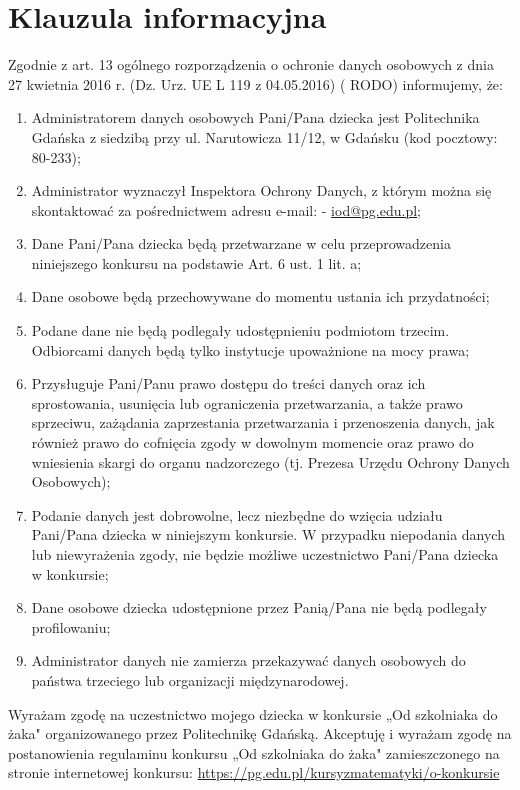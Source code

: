\documentclass[10pt]{article}
\begin{document}
\section*{Klauzula informacyjna}
Zgodnie z art. 13 ogólnego rozporządzenia o ochronie danych osobowych z dnia 27 kwietnia 2016 r. (Dz. Urz. UE L 119 z 04.05.2016) ( RODO) informujemy, że:

\begin{enumerate}
  \item Administratorem danych osobowych Pani/Pana dziecka jest Politechnika Gdańska z siedzibą przy ul. Narutowicza 11/12, w Gdańsku (kod pocztowy: 80-233);
  \item Administrator wyznaczył Inspektora Ochrony Danych, z którym można się skontaktować za pośrednictwem adresu e-mail: - \href{mailto:iod@pg.edu.pl}{iod@pg.edu.pl};
  \item Dane Pani/Pana dziecka będą przetwarzane w celu przeprowadzenia niniejszego konkursu na podstawie Art. 6 ust. 1 lit. a;
  \item Dane osobowe będą przechowywane do momentu ustania ich przydatności;
  \item Podane dane nie będą podlegały udostępnieniu podmiotom trzecim. Odbiorcami danych będą tylko instytucje upoważnione na mocy prawa;
  \item Przysługuje Pani/Panu prawo dostępu do treści danych oraz ich sprostowania, usunięcia lub ograniczenia przetwarzania, a także prawo sprzeciwu, zażądania zaprzestania przetwarzania i przenoszenia danych, jak również prawo do cofnięcia zgody w dowolnym momencie oraz prawo do wniesienia skargi do organu nadzorczego (tj. Prezesa Urzędu Ochrony Danych Osobowych);
  \item Podanie danych jest dobrowolne, lecz niezbędne do wzięcia udziału Pani/Pana dziecka w niniejszym konkursie. W przypadku niepodania danych lub niewyrażenia zgody, nie będzie możliwe uczestnictwo Pani/Pana dziecka w konkursie;
  \item Dane osobowe dziecka udostępnione przez Panią/Pana nie będą podlegały profilowaniu;
  \item Administrator danych nie zamierza przekazywać danych osobowych do państwa trzeciego lub organizacji międzynarodowej.
\end{enumerate}

Wyrażam zgodę na uczestnictwo mojego dziecka w konkursie „Od szkolniaka do żaka" organizowanego przez Politechnikę Gdańską. Akceptuję i wyrażam zgodę na postanowienia regulaminu konkursu „Od szkolniaka do żaka" zamieszczonego na stronie internetowej konkursu: \href{https://pg.edu.pl/kursyzmatematyki/o-konkursie}{https://pg.edu.pl/kursyzmatematyki/o-konkursie}
\end{document}
